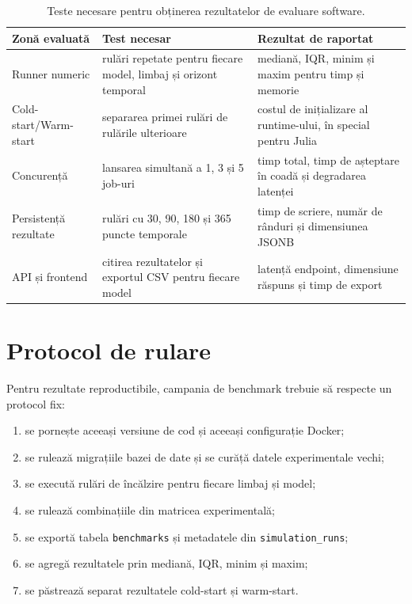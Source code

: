 \begin{table}[!htbp]
\centering
\caption[Teste necesare: evaluare software]{Teste necesare pentru obținerea rezultatelor de evaluare software.}
\label{tab:teste_necesare_software}
\begin{tabularx}{0.96\textwidth}{lX X}
\toprule
\textbf{Zonă evaluată} & \textbf{Test necesar} & \textbf{Rezultat de raportat} \\
\midrule
Runner numeric & rulări repetate pentru fiecare model, limbaj și orizont temporal & mediană, IQR, minim și maxim pentru timp și memorie \\
Cold-start/Warm-start & separarea primei rulări de rulările ulterioare & costul de inițializare al runtime-ului, în special pentru Julia \\
Concurență & lansarea simultană a 1, 3 și 5 job-uri & timp total, timp de așteptare în coadă și degradarea latenței \\
Persistență rezultate & rulări cu 30, 90, 180 și 365 puncte temporale & timp de scriere, număr de rânduri și dimensiunea JSONB \\
API și frontend & citirea rezultatelor și exportul CSV pentru fiecare model & latență endpoint, dimensiune răspuns și timp de export \\
\bottomrule
\end{tabularx}
\end{table}

\section{Protocol de rulare}
\label{subsec:protocoale}

Pentru rezultate reproductibile, campania de benchmark trebuie să respecte un
protocol fix:
\begin{enumerate}
    \item se pornește aceeași versiune de cod și aceeași configurație Docker;
    \item se rulează migrațiile bazei de date și se curăță datele experimentale
    vechi;
    \item se execută rulări de încălzire pentru fiecare limbaj și model;
    \item se rulează combinațiile din matricea experimentală;
    \item se exportă tabela \texttt{benchmarks} și metadatele din
    \texttt{simulation\_runs};
    \item se agregă rezultatele prin mediană, IQR, minim și maxim;
    \item se păstrează separat rezultatele cold-start și warm-start.
\end{enumerate}

